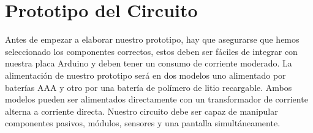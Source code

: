 \section{Prototipo del Circuito}
\par 
Antes de empezar a elaborar nuestro prototipo, hay que asegurarse que hemos seleccionado los componentes correctos, estos deben ser fáciles de integrar con nuestra placa Arduino y deben tener un consumo de corriente moderado. La alimentación de nuestro prototipo será en dos modelos uno alimentado por baterías AAA y otro por una batería de polímero de litio recargable. Ambos modelos pueden ser alimentados directamente con un transformador de corriente alterna a corriente directa. Nuestro circuito debe ser capaz de manipular componentes pasivos, módulos, sensores y una pantalla simultáneamente.




